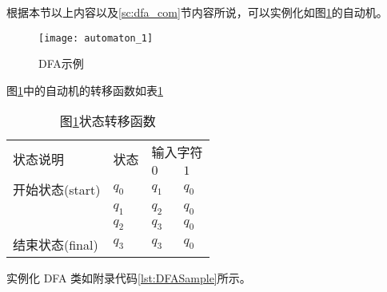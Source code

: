 根据本节以上内容以及\ref{sc:dfa_com}节内容所说，可以实例化如图\ref{fig:DFA1}的自动机。

\begin{figure}[!htbp]
    \centering
    \texttt{[image: automaton\_1]}
    \caption{DFA示例}
    \label{fig:DFA1}
\end{figure}

图\ref{fig:DFA1}中的自动机的转移函数如表\ref{tab:DFA1}

\begin{table}[!htbp]
    \caption{图{\ref{fig:DFA1}}状态转移函数}
    \label{tab:DFA1}
    \centering
    \small%
    \setlength{\tabcolsep}{4pt}%
    \renewcommand{\arraystretch}{1.2}%
    \begin{tabular}{l p{3em}<{\centering} p{3em}<{\centering} p{3em}<{\centering}}
        \toprule %
        \multirow{2}{*}{状态说明} & \multirow{2}{*}{状态} & \multicolumn{2}{c}{输入字符} \\
		\cline{3-4}      &    &$0$ & $1$  \\
        \midrule%
        开始状态(start)          & $q_0$ & $q_1$  & $q_0$    \\
                                & $q_1$ & $q_2$  & $q_0$    \\
                                & $q_2$ & $q_3$  & $q_0$    \\
        结束状态(final)         & $q_3$ & $q_3$  & $q_0$    \\
        \bottomrule%
    \end{tabular}
\end{table}

实例化 DFA 类如附录代码\ref{lst:DFASample}所示。






